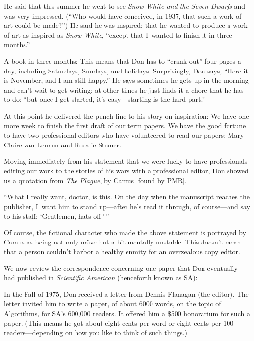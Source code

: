 He said that this summer he went to see {\sl Snow White and the Seven Dwarfs\/}
and was very impressed. (``Who would have conceived, in 1937, that such a
work of art could be made?'') He said he was inspired; that he wanted to
produce a work of art as inspired as {\sl Snow White}, ``except that I~wanted to
finish it in three months.''

A book in three months: This means that Don has to 
``crank out''  four pages a day,
including Saturdays, Sundays, and holidays. Surprisingly, Don says, ``Here
it is November, and I am still happy.''  He says sometimes he gets up in
the morning and can't wait to get writing; at other times he just finds it
a chore that he has to do; ``but once I get started,
it's easy---starting is the hard part.''

At this point he delivered the punch line to his story on inspiration: We
have one more week to finish the first draft of our term papers.  We have
the good fortune to have two professional editors who have volunteered to
read our papers: Mary-Claire van Leunen and Rosalie Stemer.  

Moving immediately from his statement that we were lucky to have
professionals editing our work to the stories of his wars with a 
professional  editor,
Don showed us a quotation from {\sl The Plague}, by Camus [found by PMR].

{\narrower\smallskip\noindent
    ``What I really want, doctor, is this.  On the day when the manuscript
    reaches the publisher, I~want him to stand up---after he's read it
    through, of course---and say to his staff: `Gentlemen, hats off!'$\,$''
\smallskip}

Of course, the fictional character who made the above statement is
portrayed by Camus as being not only na\"\i ve but a bit mentally unstable.
This doesn't mean that a person couldn't harbor a healthy enmity for an
overzealous copy editor.

We now review the correspondence concerning one paper that Don eventually
had published in {\sl Scientific American\/} (henceforth known as SA):

In the Fall of 1975, Don received a letter from Dennis Flanagan (the editor).
The letter invited him to write a paper, of about
6000 words, on the topic of Algorithms, for SA's 600,000 readers.  It
offered him a \$500 honorarium for such a paper. (This means he got about
eight cents per word or eight cents per 100 readers---depending on how you
like to think of such things.)

